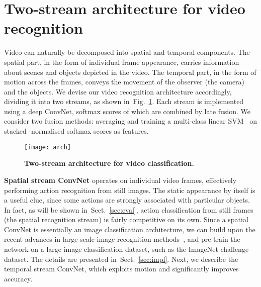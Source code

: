 \documentclass{article} \usepackage{nips14submit_e,times}
\newcommand{\figref}[1]{Fig.~\ref{#1}}
\newcommand{\sref}[1]{Sect.~\ref{#1}}
\begin{document}
\section{Two-stream architecture for video recognition}
\label{sec:arch}
Video can naturally be decomposed into spatial and temporal components. The spatial part, in the form of individual frame appearance, carries information about scenes and 
objects depicted in the video. The temporal part, in the form of motion across the frames, conveys the movement of the observer (the camera) and the objects. 
We devise our video recognition architecture accordingly, dividing it into two streams, as shown in~\figref{fig:arch}. Each stream is implemented using a deep ConvNet, 
softmax scores of which are combined by late fusion. We consider two fusion methods: averaging and training a multi-class linear SVM~\cite{Crammer01} on stacked -normalised softmax scores
as features.
\begin{figure}[ht]
\centering
\texttt{[image: arch]}
\caption{\textbf{Two-stream architecture for video classification.}}
\label{fig:arch}
\end{figure}


\noindent\textbf{Spatial stream ConvNet} operates on individual video frames, effectively performing action recognition from still images.
The static appearance by itself is a useful clue, since some actions are strongly associated with particular objects. 
In fact, as will be shown in~\sref{sec:eval}, action classification from still frames (the spatial recognition stream) is fairly competitive on its own.
Since a spatial ConvNet is essentially an image classification architecture, we can build upon the recent advances in large-scale image recognition methods~\cite{Krizhevsky12},
and pre-train the network on a large image classification dataset, such as the ImageNet challenge dataset. The details are presented in~\sref{sec:impl}.
Next, we describe the temporal stream ConvNet, which exploits motion and significantly improves accuracy.
\end{document}
